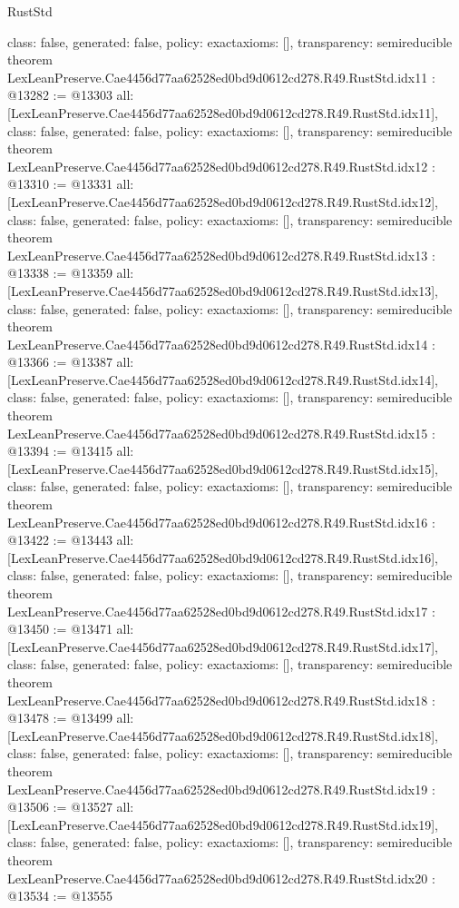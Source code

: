 \begin{lexlean}{RustStd}
\begin{coremodule}
{  class: false,
  generated: false,
  policy: exact{axioms: []},
  transparency: semireducible
}
theorem LexLeanPreserve.Cae4456d77aa62528ed0bd9d0612cd278.R49.RustStd.idx11 : @13282 := @13303 {
  all: [LexLeanPreserve.Cae4456d77aa62528ed0bd9d0612cd278.R49.RustStd.idx11],
  class: false,
  generated: false,
  policy: exact{axioms: []},
  transparency: semireducible
}
theorem LexLeanPreserve.Cae4456d77aa62528ed0bd9d0612cd278.R49.RustStd.idx12 : @13310 := @13331 {
  all: [LexLeanPreserve.Cae4456d77aa62528ed0bd9d0612cd278.R49.RustStd.idx12],
  class: false,
  generated: false,
  policy: exact{axioms: []},
  transparency: semireducible
}
theorem LexLeanPreserve.Cae4456d77aa62528ed0bd9d0612cd278.R49.RustStd.idx13 : @13338 := @13359 {
  all: [LexLeanPreserve.Cae4456d77aa62528ed0bd9d0612cd278.R49.RustStd.idx13],
  class: false,
  generated: false,
  policy: exact{axioms: []},
  transparency: semireducible
}
theorem LexLeanPreserve.Cae4456d77aa62528ed0bd9d0612cd278.R49.RustStd.idx14 : @13366 := @13387 {
  all: [LexLeanPreserve.Cae4456d77aa62528ed0bd9d0612cd278.R49.RustStd.idx14],
  class: false,
  generated: false,
  policy: exact{axioms: []},
  transparency: semireducible
}
theorem LexLeanPreserve.Cae4456d77aa62528ed0bd9d0612cd278.R49.RustStd.idx15 : @13394 := @13415 {
  all: [LexLeanPreserve.Cae4456d77aa62528ed0bd9d0612cd278.R49.RustStd.idx15],
  class: false,
  generated: false,
  policy: exact{axioms: []},
  transparency: semireducible
}
theorem LexLeanPreserve.Cae4456d77aa62528ed0bd9d0612cd278.R49.RustStd.idx16 : @13422 := @13443 {
  all: [LexLeanPreserve.Cae4456d77aa62528ed0bd9d0612cd278.R49.RustStd.idx16],
  class: false,
  generated: false,
  policy: exact{axioms: []},
  transparency: semireducible
}
theorem LexLeanPreserve.Cae4456d77aa62528ed0bd9d0612cd278.R49.RustStd.idx17 : @13450 := @13471 {
  all: [LexLeanPreserve.Cae4456d77aa62528ed0bd9d0612cd278.R49.RustStd.idx17],
  class: false,
  generated: false,
  policy: exact{axioms: []},
  transparency: semireducible
}
theorem LexLeanPreserve.Cae4456d77aa62528ed0bd9d0612cd278.R49.RustStd.idx18 : @13478 := @13499 {
  all: [LexLeanPreserve.Cae4456d77aa62528ed0bd9d0612cd278.R49.RustStd.idx18],
  class: false,
  generated: false,
  policy: exact{axioms: []},
  transparency: semireducible
}
theorem LexLeanPreserve.Cae4456d77aa62528ed0bd9d0612cd278.R49.RustStd.idx19 : @13506 := @13527 {
  all: [LexLeanPreserve.Cae4456d77aa62528ed0bd9d0612cd278.R49.RustStd.idx19],
  class: false,
  generated: false,
  policy: exact{axioms: []},
  transparency: semireducible
}
theorem LexLeanPreserve.Cae4456d77aa62528ed0bd9d0612cd278.R49.RustStd.idx20 : @13534 := @13555 {
}
\end{coremodule}
\end{lexlean}
